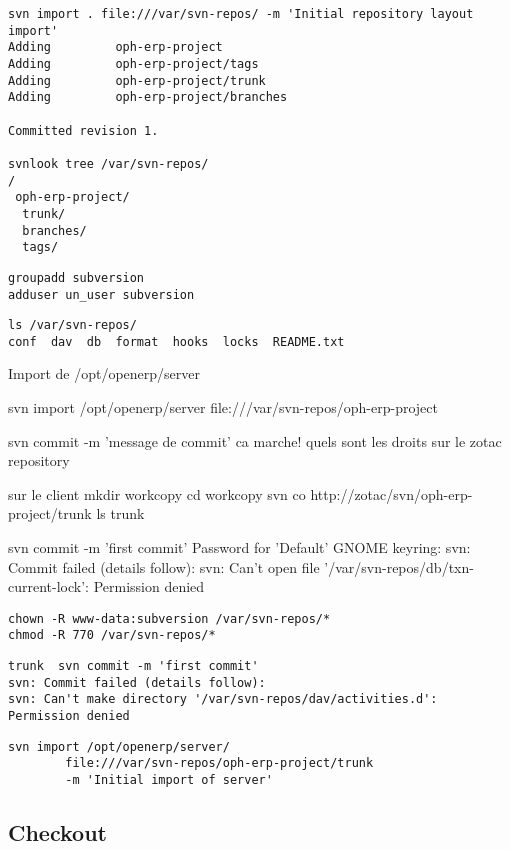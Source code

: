 \documentclass[12pt,a4paper]{article}
\begin{document}
\begin{verbatim}
svn import . file:///var/svn-repos/ -m 'Initial repository layout import'
Adding         oph-erp-project
Adding         oph-erp-project/tags
Adding         oph-erp-project/trunk
Adding         oph-erp-project/branches

Committed revision 1.

svnlook tree /var/svn-repos/
/
 oph-erp-project/
  trunk/
  branches/
  tags/
\end{verbatim}

\begin{verbatim}
groupadd subversion
adduser un_user subversion
\end{verbatim}


\begin{verbatim}
ls /var/svn-repos/
conf  dav  db  format  hooks  locks  README.txt
\end{verbatim}

Import de /opt/openerp/server

svn import /opt/openerp/server file:///var/svn-repos/oph-erp-project




svn commit -m 'message de commit'
ca marche! quels sont les droits sur le zotac repository

sur le client 
mkdir workcopy
cd workcopy
svn co http://zotac/svn/oph-erp-project/trunk
ls 
trunk


svn commit -m 'first commit'
Password for 'Default' GNOME keyring: 
svn: Commit failed (details follow):
svn: Can't open file '/var/svn-repos/db/txn-current-lock': Permission denied

\begin{verbatim}
chown -R www-data:subversion /var/svn-repos/*
chmod -R 770 /var/svn-repos/*
\end{verbatim}

\begin{verbatim}
trunk  svn commit -m 'first commit'
svn: Commit failed (details follow):
svn: Can't make directory '/var/svn-repos/dav/activities.d': Permission denied
\end{verbatim}

\begin{verbatim}
svn import /opt/openerp/server/ 
        file:///var/svn-repos/oph-erp-project/trunk 
        -m 'Initial import of server'
\end{verbatim}

\subsection{Checkout}
\label{sec:checkout}
\end{document}
